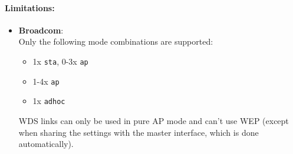 \paragraph{Limitations:}

\begin{itemize}
	\item \textbf{Broadcom}: \\
		Only the following mode combinations are supported:
		
		\begin{itemize}
			\item 1x \texttt{sta}, 0-3x \texttt{ap}
			\item 1-4x \texttt{ap}
			\item 1x \texttt{adhoc}
		\end{itemize}

		WDS links can only be used in pure AP mode and can't use WEP (except when sharing the
		settings with the master interface, which is done automatically).

\end{itemize}


